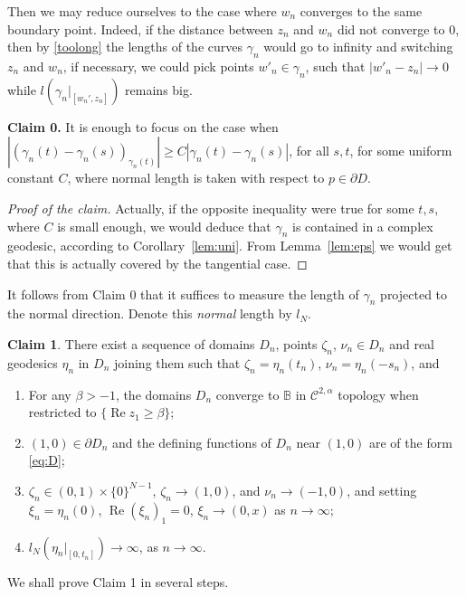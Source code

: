 \documentclass[a4paper,12pt]{amsart}
\def\re{\operatorname{Re}}
\theoremstyle{remark}\newtheorem{remark}[theorem]{Remark}
\begin{document}
Then we may reduce ourselves to the case where $w_n$
converges to the same boundary point. Indeed, if the distance between $z_n$ and $w_n$ did not converge to 0, then 
by \eqref{toolong} the lengths of the curves
$\gamma_n$ would go to infinity and switching $z_n$ and $w_n$, if necessary, we could pick points $w'_n \in \gamma_n$, 
such that $|w'_n-z_n|\to 0$ while $l(\gamma_n|_{[w_n',z_n]})$ remains big.

\bigskip

{\bf Claim 0.} It is enough to focus on the case when $|\left(\gamma_n(t) - \gamma_n(s)\right)_{\gamma_n(t)}|\geq C |\gamma_n(t) - \gamma_n(s)|$, 
for all $s, t$, for some uniform constant $C$, where normal length is taken with respect to $p\in \partial D$. 

\begin{proof}[Proof of the claim] Actually, if the opposite inequality were true for some $t,s$, where $C$ is small enough, we would deduce that $\gamma_n$ is contained in a complex geodesic, according to Corollary~\ref{lem:uni}. From Lemma~\ref{lem:eps} we would get that this is actually covered by the tangential case. 
\end{proof}

It follows from Claim 0 that it suffices to measure the length of $\gamma_n$ projected to the normal direction. Denote this {\it normal} length by $l_N$.

\bigskip


{\bf Claim 1}. There exist a sequence of domains $D_n$, points $\zeta_n$, $\nu_n\in D_n$ and real geodesics $\eta_n$ in $D_n$ joining them such that $\zeta_n=\eta_n(t_n)$, $\nu_n=\eta_n(-s_n)$, and
\begin{enumerate}
\item For any $\beta>-1$, the domains $D_n$ converge to $\mathbb B$ in $\mathcal C^{2,\alpha}$ topology when restricted to $\{\re z_1\geq \beta\}$;
\item  $(1,0)\in \partial D_n$ and the defining functions of $D_n$ near $(1,0)$ are of the form \eqref{eq:D};
\item $\zeta_n\in (0,1)\times \{0\}^{N-1}$, $\zeta_n\to (1,0)$, and $\nu_n\to (-1,0)$, and setting $\xi_n=\eta_n(0)$,
$\re (\xi_n)_1=0$, $\xi_n\to (0, x)$ as $n\to \infty$;
\item $l_N(\eta_n|_{[0,t_n]})\to \infty$, as $n\to \infty$.
\end{enumerate}

\bigskip

We shall prove Claim 1 in several steps. 
\end{document}
